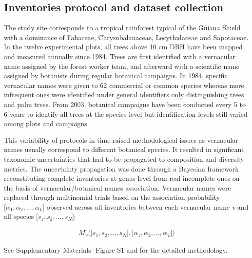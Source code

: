 \documentclass[fleqn,10pt]{ArtEcoFoG} %
\begin{document}
\subsection{Inventories protocol and dataset
collection}\label{inventories-protocol-and-dataset-collection}

The study site corresponds to a tropical rainforest typical of the
Guiana Shield with a dominance of Fabaceae, Chrysobalanaceae,
Lecythidaceae and Sapotaceae. In the twelve experimental plots, all
trees above 10 cm DBH have been mapped and measured annually since 1984.
Trees are first identified with a vernacular name assigned by the forest
worker team, and afterward with a scientific name assigned by botanists
during regular botanical campaigns. In 1984, specific vernacular names
were given to 62 commercial or common species whereas more infrequent
ones were identified under general identifiers only distinguishing trees
and palm trees. From 2003, botanical campaigns have been conducted every
5 to 6 years to identify all trees at the species level but
identification levels still varied among plots and campaigns.

This variability of protocols in time raised methodological issues as
vernacular names usually correspond to different botanical species. It
resulted in significant taxonomic uncertainties that had to be
propagated to composition and diversity metrics. The uncertainty
propagation was done through a Bayesian framework reconstituting
complete inventories at genus level from real incomplete ones on the
basis of vernacular/botanical names association. Vernacular names were
replaced through multinomial trials based on the association probability
\(\big[\alpha_1, \alpha_2,..., \alpha_V\big]\) observed across all
inventories between each vernacular name \emph{v} and all species
\(\big[s_1, s_2,..., s_N\big]\):

\begin{align}
M_v\Big(\big[s_1, s_2,..., s_N\big],\big[\alpha_1, \alpha_2,..., \alpha_V\big]\Big) \nonumber
\end{align}

See Supplementary Materials -Figure S1 and \citet{Aubry-Kientz2013} for
the detailed methodology.
\end{document}
